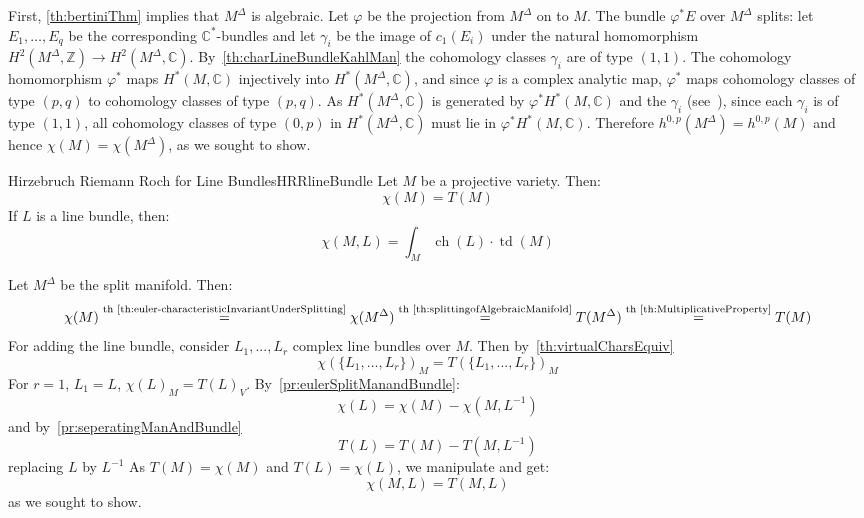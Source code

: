 \documentclass{book}
\newenvironment{Proof}[1][]
  {\begin{ProofTcb}[#1]}
  {\end{ProofTcb}}
\renewcommand{\phi}{\varphi}
\newcommand{\ch}{{\operatorname{ch}}}
\newcommand{\td}{{\operatorname{td}}}
\renewcommand{\ch}{{\operatorname{ch}}}
\begin{document}
\begin{Proof}
  First, \cref{th:bertiniThm} implies that $M^\Delta$ is algebraic. Let $\phi$ be the projection from
  $M^\Delta$ on to $M$. The bundle $\phi^* E$ over $M^\Delta$ splits: let $E_1,\ldots,E_q$ be the
  corresponding
  $\mathbb{C}^*$-bundles and let $\gamma_i$ be the image of $c_1(E_i)$ under the natural homomorphism
  $H^2(M^\Delta,\mathbb{Z}) \to H^2(M^\Delta,\mathbb{C})$. By~\cref{th:charLineBundleKahlMan} the cohomology classes $\gamma_i$ are of type $(1,1)$. The
  cohomology homomorphism $\phi^*$ maps $H^*(M,\mathbb{C})$ injectively into $H^*(M^\Delta,\mathbb{C})$, and since $\phi$ is a complex analytic map, $\phi^*$ maps cohomology classes of type
  $(p,q)$ to cohomology classes of type $(p,q)$. As $H^*(M^\Delta,\mathbb{C})$ is generated by
  $\phi^* H^*(M,\mathbb{C})$ and the $\gamma_i$ (see~\cite{NateKTheory}), since each $\gamma_i$ is of type
  $(1,1)$, all cohomology classes of type $(0,p)$ in $H^*(M^\Delta,\mathbb{C})$ must lie in $\phi^*
  H^*(M,\mathbb{C})$. Therefore $h^{0,p}(M^\Delta) = h^{0,p}(M)$ and hence $\chi(M) = \chi(M^\Delta)$, as we
  sought to show.

\end{Proof}

\begin{thm}{Hirzebruch Riemann Roch for Line Bundles}{HRRlineBundle}
  Let $M$ be a projective variety. Then:
  \[
    \chi(M) = T(M)
  \]
  If $L$ is a line bundle, then:
  \[
    \chi(M,L) = \int_M \ch(L)\cdot \td(M)
  \]
\end{thm}

\begin{Proof}
  Let $M^\Delta$ be the split manifold. Then:
  \[
    \chi(M) \overset{\text{th~\ref{th:euler-characteristicInvariantUnderSplitting}}}{=} \chi(M^\Delta)
      \overset{\text{th~\ref{th:splittingofAlgebraicManifold}}}{=} T(M^\Delta)
      \overset{\text{th~\ref{th:MultiplicativeProperty}}}{=} T(M)
  \]
  For adding the line bundle, consider
  $L_1,..., L_r$ complex line bundles over $M$. Then by~\cref{th:virtualCharsEquiv}
  \[
    \chi(\{L_1, ..., L_r\})_M = T(\{L_1, ..., L_r\})_M
  \]
  For $r = 1$, $L_1 = L$, $\chi(L)_M = T(L)_V$. By~\cref{pr:eulerSplitManandBundle}:
  \[
  \chi(L) = \chi(M) - \chi(M,L^{-1})
\]
  and by~\cref{pr:seperatingManAndBundle}
\[
  T(L) = T(M) - T(M,L^{-1})
\]
  replacing $L$ by $L^{-1}$ As $T(M) = \chi(M)$ and $T(L) = \chi(L)$, we manipulate and get:
  \[
    \chi(M,L) = T(M,L)
  \]
as we sought to show.
\end{Proof}
\end{document}
